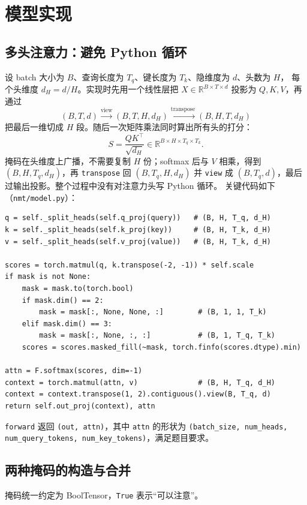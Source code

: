 \documentclass[UTF8,a4paper,11pt]{ctexart}
\begin{document}
\section{模型实现}

\subsection{多头注意力：避免 Python 循环}
设 batch 大小为 $B$、查询长度为 $T_q$、键长度为 $T_k$、隐维度为 $d$、头数为 $H$，
每个头维度 $d_H=d/H$。实现时先用一个线性层把 $X\in\mathbb{R}^{B\times T\times d}$
投影为 $Q,K,V$，再通过
\[
(B,T,d)\xrightarrow{\text{view}}(B,T,H,d_H)
\xrightarrow{\text{transpose}}(B,H,T,d_H)
\]
把最后一维切成 $H$ 段。随后一次矩阵乘法同时算出所有头的打分：
\[
S = \frac{QK^{\top}}{\sqrt{d_H}}\in\mathbb{R}^{B\times H\times T_q\times T_k}.
\]
掩码在头维度上广播，不需要复制 $H$ 份；softmax 后与 $V$ 相乘，得到
$(B,H,T_q,d_H)$，再 \texttt{transpose} 回 $(B,T_q,H,d_H)$ 并 \texttt{view} 成
$(B,T_q,d)$，最后过输出投影。整个过程中没有对注意力头写 Python 循环。
关键代码如下（\texttt{nmt/model.py}）：

\begin{lstlisting}
q = self._split_heads(self.q_proj(query))   # (B, H, T_q, d_H)
k = self._split_heads(self.k_proj(key))     # (B, H, T_k, d_H)
v = self._split_heads(self.v_proj(value))   # (B, H, T_k, d_H)

scores = torch.matmul(q, k.transpose(-2, -1)) * self.scale
if mask is not None:
    mask = mask.to(torch.bool)
    if mask.dim() == 2:
        mask = mask[:, None, None, :]        # (B, 1, 1, T_k)
    elif mask.dim() == 3:
        mask = mask[:, None, :, :]           # (B, 1, T_q, T_k)
    scores = scores.masked_fill(~mask, torch.finfo(scores.dtype).min)

attn = F.softmax(scores, dim=-1)
context = torch.matmul(attn, v)              # (B, H, T_q, d_H)
context = context.transpose(1, 2).contiguous().view(B, T_q, d)
return self.out_proj(context), attn
\end{lstlisting}

\texttt{forward} 返回 \texttt{(out, attn)}，其中 \texttt{attn} 的形状为
\texttt{(batch\_size, num\_heads, num\_query\_tokens, num\_key\_tokens)}，满足题目要求。

\subsection{两种掩码的构造与合并}
掩码统一约定为 BoolTensor，\texttt{True} 表示“可以注意”。
\end{document}
